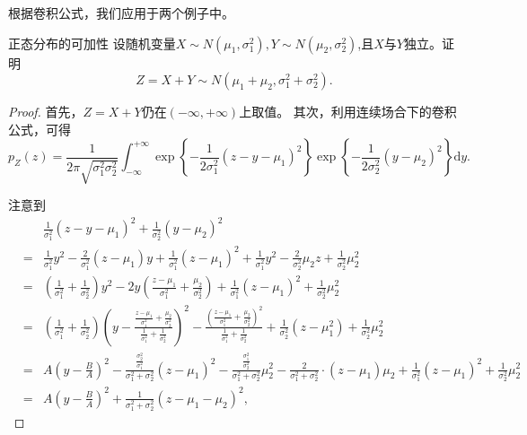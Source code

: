 根据卷积公式，我们应用于两个例子中。
\begin{example}{正态分布的可加性}
设随机变量$X \sim N\left(\mu_{1}, \sigma_{1}^{2}\right), Y \sim N\left(\mu_{2}, \sigma_{2}^{2}\right)$,且$X$与$Y$独立。证明$$Z=X+Y \sim N\left(\mu_{1}+\mu_{2}, \sigma_{1}^{2}+\sigma_{2}^{2}\right).$$
\end{example}
\begin{proof}
首先，$Z=X+Y$仍在$(-\infty,+\infty)$上取值。
其次，利用连续场合下的卷积公式，可得
$$p_{Z}(z)=\frac{1}{2 \pi \sqrt{\sigma_{1}^{2} \sigma_{2}^{2}}} \int_{-\infty}^{+\infty} \exp \left\{-\frac{1}{2 \sigma_{1}^{2}}\left(z-y-\mu_{1}\right)^{2}\right\} \exp \left\{-\frac{1}{2 \sigma_{2}^{2}}\left(y-\mu_{2}\right)^{2}\right\} \text{d} y .$$
 
 注意到
 \begin{eqnarray*}
& &\frac{1}{\sigma_{1}^{2}}\left(z-y-\mu_{1}\right)^{2}+\frac{1}{\sigma_{2}^{2}}\left(y-\mu_{2}\right)^{2} \\
&=& \frac{1}{\sigma_{1}^{2}} y^{2}-\frac{2}{\sigma_{1}^{2}}\left(z-\mu_{1}\right) y+\frac{1}{\sigma_{1}^{2}}\left(z-\mu_{1}\right)^{2}+\frac{1}{\sigma_{1}^{2}} y^{2}-\frac{2}{\sigma_{2}^{2}} \mu_{2} z+\frac{1}{\sigma_{2}^{2}} \mu_{2}^{2} \\
&=&\left(\frac{1}{\sigma_{1}^{2}}+\frac{1}{\sigma_{2}^{2}}\right) y^{2}-2 y\left(\frac{z-\mu_{1}}{\sigma_{1}^{2}}+\frac{\mu_{2}}{\sigma_{2}^{2}}\right)+\frac{1}{\sigma_{1}^{2}}\left(z-\mu_{1}\right)^{2}+\frac{1}{\sigma_{2}^{2}} \mu_{2}^{2} \\
&=&\left(\frac{1}{\sigma_{1}^{2}}+\frac{1}{\sigma_{2}^{2}}\right)\left(y-\frac{\frac{z-\mu_{1}}{\sigma_{1}^{2}}+\frac{\mu_{2}}{\sigma_{2}^{2}}}{\frac{1}{\sigma_{1}^{2}}+\frac{1}{\sigma_{2}^{2}}}\right)^{2}-\frac{\left(\frac{z-\mu_{1}}{\sigma_{1}^{2}}+\frac{\mu_{2}}{\sigma_{2}^{2}}\right)^{2}}{\frac{1}{\sigma_{1}^{2}}+\frac{1}{\sigma_{2}^{2}}}+\frac{1}{\sigma_{2}^{2}}\left(z-\mu_{1}^{2}\right)+\frac{1}{\sigma_{2}^{2}} \mu_{2}^{2} \\
&=& A\left(y-\frac{B}{A}\right)^{2}-\frac{\frac{\sigma_{2}^{2}}{\sigma_{1}^{2}}}{\sigma_{1}^{2}+\sigma_{2}^{2}}\left(z-\mu_{1}\right)^{2}-\frac{\frac{\sigma_{1}^{2}}{\sigma_{2}^{2}}}{\sigma_{1}^{2}+\sigma_{2}^{2}} \mu_{2}^{2} 
-\frac{2}{\sigma_{1}^{2}+\sigma_{2}^{2}} \cdot\left(z-\mu_{1}\right) \mu_{2}+\frac{1}{\sigma_{1}^{2}}\left(z-\mu_{1}\right)^{2}+\frac{1}{\sigma_{2}^{2}} \mu_{2}^{2} \\
&=& A\left(y-\frac{B}{A}\right)^{2}+\frac{1}{\sigma_{1}^{2}+\sigma_{2}^{2}}\left(z-\mu_{1}-\mu_{2}\right)^{2},

\end{eqnarray*}
\end{proof}
